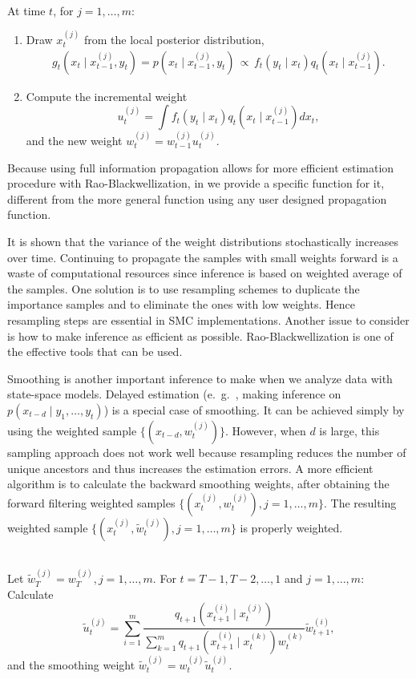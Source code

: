 \\
At time $t$, for $j=1,\ldots,m$:
\begin{enumerate}
\item Draw $x_t^{(j)}$ from the local posterior distribution,
\begin{align*}
g_t(x_t\mid x_{t-1}^{(j)}, y_t)=p(x_t \mid x_{t-1}^{(j)},y_t)\, \propto\,  f_t(y_t\mid x_t)q_t(x_t \mid x_{t-1}^{(j)}).
\end{align*}
\item Compute the incremental weight
\[
u_t^{(j)}=\int f_t(y_t \mid x_t) q_t(x_t \mid x_{t-1}^{(j)})dx_t,
\]
and the new weight $w_t^{(j)}=w_{t-1}^{(j)}u_t^{(j)}$.
\end{enumerate}


Because using full information propagation allows for more efficient estimation procedure with Rao-Blackwellization, in  we provide a specific function for it, different from the more general function using any user designed propagation function.

It is shown that the variance of the weight distributions stochastically increases over time. Continuing to propagate the samples with small weights forward is a waste of computational resources since inference is based on weighted average of the samples. One solution is to use resampling schemes to duplicate the importance samples and to eliminate the ones with low weights. Hence resampling steps are essential in SMC implementations. Another issue to consider is how to make inference as efficient as possible. Rao-Blackwellization is one of the effective tools that can be used.

Smoothing is another important inference to make when we analyze data with state-space models. Delayed estimation (e.\ g.\ , making inference on $p(x_{t-d}\mid y_1,\ldots,y_t)$) is a special case of smoothing. It can be achieved simply by using the weighted sample $\{(x_{t-d},w_t^{(j)})\}$. However, when $d$ is large, this sampling approach does not work well because resampling reduces the number of unique ancestors and thus increases the estimation errors. A more efficient algorithm is to calculate the backward smoothing weights, after obtaining the forward filtering weighted samples $\{(x_t^{(j)},w_t^{(j)}), j=1,\ldots,m\}$. The resulting weighted sample $\{(x_t^{(j)}, \tilde{w}_t^{(j)}), j=1,\ldots,m\}$ is properly weighted.

\\
Let $\tilde{w}_T^{(j)}=w_T^{(j)}, j=1,\ldots,m$. For $t=T-1,T-2,\ldots, 1$ and $j=1,\ldots, m$: \\
Calculate
\[
\tilde{u}_t^{(j)}=\sum_{i=1}^m \frac{q_{t+1}(x_{t+1}^{(i)}\mid x_t^{(j)})}{\sum_{k=1}^m q_{t+1}(x_{t+1}^{(i)}\mid x_t^{(k)}) w_t^{(k)}} \tilde{w}_{t+1}^{(i)},
\]
and the smoothing weight $\tilde{w}_t^{(j)}=w_t^{(j)}\tilde{u}_t^{(j)}$.



